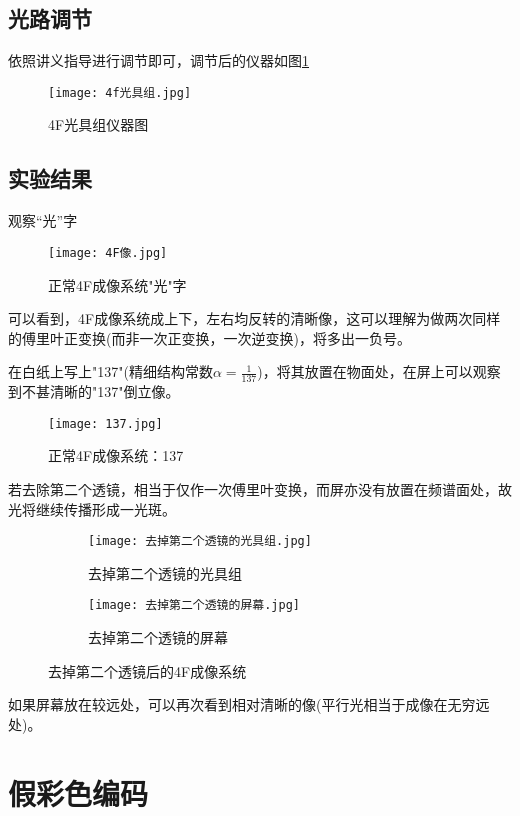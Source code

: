 \documentclass[11pt]{article}
\begin{document}
	\subsection{光路调节}
	依照讲义指导进行调节即可，调节后的仪器如图\ref{fig:4f}
	\begin{figure}[H]
		\centering
		\texttt{[image: 4f光具组.jpg]}
		\caption{4F光具组仪器图}
		\label{fig:4f}
	\end{figure}
	
	\subsection{实验结果}
	观察“光”字
	\begin{figure}[H]
		\centering
		\texttt{[image: 4F像.jpg]}
		\caption{正常4F成像系统"光"字}
		\label{fig:4F像}
	\end{figure}
	可以看到，4F成像系统成上下，左右均反转的清晰像，这可以理解为做两次同样的傅里叶正变换(而非一次正变换，一次逆变换)，将多出一负号。
	
	在白纸上写上"137"(精细结构常数$\alpha=\frac{1}{137}$)，将其放置在物面处，在屏上可以观察到不甚清晰的"137"倒立像。
	\begin{figure}[H]
		\centering
		\texttt{[image: 137.jpg]}
		\caption{正常4F成像系统：137}
		\label{fig:137}
	\end{figure}
	
	若去除第二个透镜，相当于仅作一次傅里叶变换，而屏亦没有放置在频谱面处，故光将继续传播形成一光斑。
	\begin{figure}[H]
		\centering
		\begin{subfigure}[t]{0.45\textwidth}  %
			\centering
			\texttt{[image: 去掉第二个透镜的光具组.jpg]}  %
			\caption{去掉第二个透镜的光具组}
		\end{subfigure}
		\begin{subfigure}[t]{0.45\textwidth}  %
			\centering
			\texttt{[image: 去掉第二个透镜的屏幕.jpg]}  %
			\caption{去掉第二个透镜的屏幕}
		\end{subfigure}
		\caption{去掉第二个透镜后的4F成像系统}
		\label{fig:remove_second}
	\end{figure}
	如果屏幕放在较远处，可以再次看到相对清晰的像(平行光相当于成像在无穷远处)。
	
	
	\section{假彩色编码}
\end{document}
